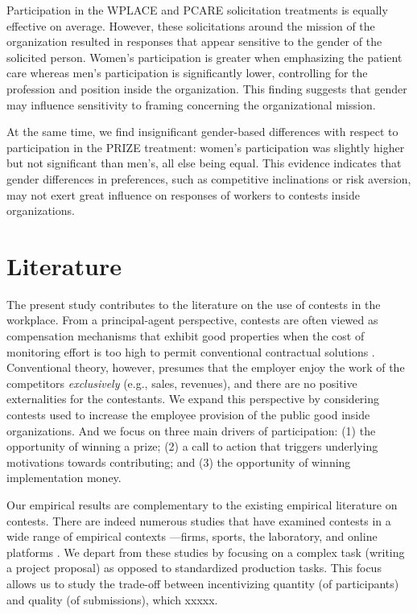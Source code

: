 \documentclass[12pt, titlepage]{article}
\begin{document}
Participation in the WPLACE and PCARE solicitation treatments is equally
effective on average. However, these solicitations around the mission of
the organization resulted in responses that appear sensitive to the
gender of the solicited person. Women's participation is greater when
emphasizing the patient care whereas men's participation is
significantly lower, controlling for the profession and position inside
the organization. This finding suggests that gender may influence
sensitivity to framing concerning the organizational mission.

At the same time, we find insignificant gender-based differences with
respect to participation in the PRIZE treatment: women's participation
was slightly higher but not significant than men's, all else being
equal. This evidence indicates that gender differences in preferences,
such as competitive inclinations or risk aversion, may not exert great
influence on responses of workers to contests inside organizations.

\section{Literature}\label{literature}

The present study contributes to the literature on the use of contests
in the workplace. From a principal-agent perspective, contests are often
viewed as compensation mechanisms that exhibit good properties when the
cost of monitoring effort is too high to permit conventional contractual
solutions \citep{lazear1981rank, green1983comparison, mary1984economic}.
Conventional theory, however, presumes that the employer enjoy the work
of the competitors \emph{exclusively} (e.g., sales, revenues), and there
are no positive externalities for the contestants. We expand this
perspective by considering contests used to increase the employee
provision of the public good inside organizations. And we focus on three
main drivers of participation: (1) the opportunity of winning a prize;
(2) a call to action that triggers underlying motivations towards
contributing; and (3) the opportunity of winning implementation money.

Our empirical results are complementary to the existing empirical
literature on contests. There are indeed numerous studies that have
examined contests in a wide range of empirical contexts ---firms,
sports, the laboratory, and online platforms
\citep{bull1987tournaments, eriksson1999executive, ehrenberg1990tournaments, terwiesch2008innovation, terwiesch2009innovation, boudreau2011incentives, boudreau2016performance}.
We depart from these studies by focusing on a complex task (writing a
project proposal) as opposed to standardized production tasks. This
focus allows us to study the trade-off between incentivizing quantity
(of participants) and quality (of submissions), which xxxxx.
\end{document}
